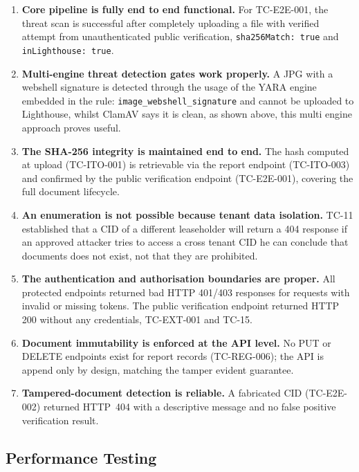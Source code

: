 \begin{enumerate}
  \item \textbf{Core pipeline is fully end to end functional.} For TC-E2E-001, the threat scan is successful after completely uploading a file with verified attempt from unauthenticated public verification, \texttt{sha256Match: true} and \texttt{inLighthouse: true}.

  \item \textbf{Multi-engine threat detection gates work properly.} A JPG with a webshell signature is detected through the usage of the YARA engine embedded in the rule: \texttt{image\_webshell\_signature} and cannot be uploaded to Lighthouse, whilst ClamAV says it is clean, as shown above, this multi engine approach proves useful.

  \item \textbf{The SHA-256 integrity is maintained end to end.}  The hash
    computed at upload (TC-ITO-001) is retrievable via the report endpoint
    (TC-ITO-003) and confirmed by the public verification endpoint
    (TC-E2E-001), covering the full document lifecycle.

  \item \textbf{An enumeration is not possible because tenant data isolation.}  TC-11 established that a CID of a different leaseholder will return a 404 response if an approved attacker tries to access a cross tenant CID he can conclude that documents does not exist, not that they are prohibited.

  \item \textbf{The authentication and authorisation boundaries are proper.}  All protected endpoints returned bad HTTP 401/403 responses for requests with invalid or missing tokens. The public verification endpoint returned HTTP 200 without any credentials, TC-EXT-001 and TC-15.

  \item \textbf{Document immutability is enforced at the API level.}  No
    PUT or DELETE endpoints exist for report records (TC-REG-006); the API
    is append only by design, matching the tamper evident guarantee.

  \item \textbf{Tampered-document detection is reliable.}  A fabricated CID
    (TC-E2E-002) returned HTTP~404 with a descriptive message and no
    false positive verification result.
\end{enumerate}

\subsection{Performance Testing}

